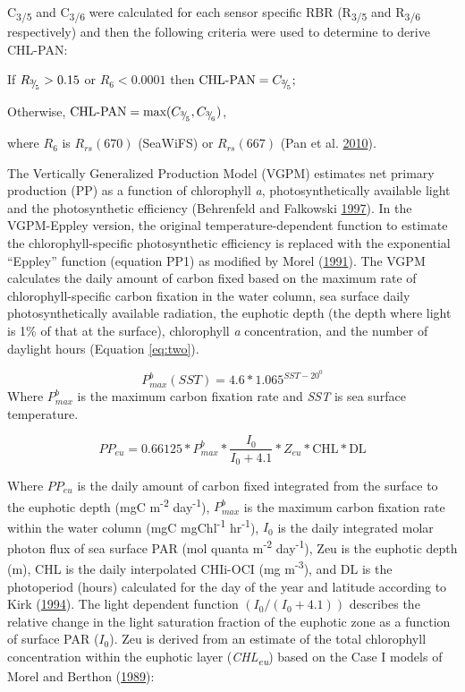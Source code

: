 \documentclass[
]{book}
\begin{document}
C\textsubscript{3/5} and C\textsubscript{3/6} were calculated for each sensor specific RBR (R\textsubscript{3/5} and R\textsubscript{3/6} respectively) and then the following criteria were used to determine to derive CHL-PAN:

If \(R_{^3{\mskip -5mu/\mskip -3mu}_5}>0.15\) or \(R_{6} <0.0001\) then \(\textrm{CHL-PAN} = C_{^3{\mskip -5mu/\mskip -3mu}_5};\)

Otherwise, \(\textrm{CHL-PAN} = \textrm{max}(C_{^3{\mskip -5mu/\mskip -3mu}_5}, C_{^3{\mskip -5mu/\mskip -3mu}_6})\),

where \(R_6\) is \(R_{rs}(670)\) (SeaWiFS) or \(R_{rs}(667)\) (Pan et al. \protect\hyperlink{ref-SOE13}{2010}).

The Vertically Generalized Production Model (VGPM) estimates net primary production (PP) as a function of chlorophyll \emph{a}, photosynthetically available light and the photosynthetic efficiency (Behrenfeld and Falkowski \protect\hyperlink{ref-SOE1}{1997}). In the VGPM-Eppley version, the original temperature-dependent function to estimate the chlorophyll-specific photosynthetic efficiency is replaced with the exponential ``Eppley'' function (equation PP1) as modified by Morel (\protect\hyperlink{ref-SOE7}{1991}). The VGPM calculates the daily amount of carbon fixed based on the maximum rate of chlorophyll-specific carbon fixation in the water column, sea surface daily photosynthetically available radiation, the euphotic depth (the depth where light is 1\% of that at the surface), chlorophyll \emph{a} concentration, and the number of daylight hours (Equation \eqref{eq:two}).

\begin{equation}
P_{max}^{b}(SST) = 4.6 * 1.065^{SST-20^{0}} 
\label{eq:two} 
\end{equation}
Where \(P_{max}^{b}\) is the maximum carbon fixation rate and \emph{SST} is sea surface temperature.

\begin{equation}
PP_{eu} = 0.66125 * P_{max}^{b} * \frac{I_{0}}{I_{0}+4.1} * Z_{eu} * \textrm{CHL} * \text{DL}
\label{eq:three} 
\end{equation}

Where \(PP_{eu}\) is the daily amount of carbon fixed integrated from the surface to the euphotic depth (mgC m\textsuperscript{-2} day\textsuperscript{-1}), \(P_{max}^{b}\) is the maximum carbon fixation rate within the water column (mgC mgChl\textsuperscript{-1} hr\textsuperscript{-1}), \(I_{0}\) is the daily integrated molar photon flux of sea surface PAR (mol quanta m\textsuperscript{-2} day\textsuperscript{-1}), Zeu is the euphotic depth (m), CHL is the daily interpolated CHIi-OCI (mg m\textsuperscript{-3}), and DL is the photoperiod (hours) calculated for the day of the year and latitude according to Kirk (\protect\hyperlink{ref-SOE6}{1994}). The light dependent function \((I_{0}/(I_{0}+4.1))\) describes the relative change in the light saturation fraction of the euphotic zone as a function of surface PAR (\(I_0\)). Zeu is derived from an estimate of the total chlorophyll concentration within the euphotic layer (\emph{CHL\textsubscript{eu}}) based on the Case I models of Morel and Berthon (\protect\hyperlink{ref-SOE8}{1989}):
\end{document}
